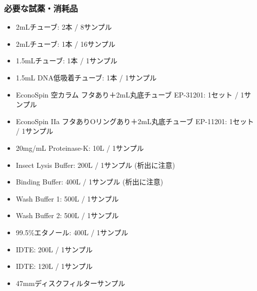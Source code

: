\documentclass[titlepage,10pt,a4paper]{jsbook}
\begin{document}
\subsubsection{必要な試薬・消耗品}
\begin{itemize}
\item 2mLチューブ: 2本 / 8サンプル
\item 2mLチューブ: 1本 / 16サンプル
\item 1.5mLチューブ: 1本 / 1サンプル
\item 1.5mL DNA低吸着チューブ: 1本 / 1サンプル
\item EconoSpin 空カラム フタあり＋2mL丸底チューブ EP-31201: 1セット / 1サンプル
\item EconoSpin IIa フタありOリングあり＋2mL丸底チューブ EP-11201: 1セット / 1サンプル
\item 20mg/mL Proteinase-K: 10{\textmu}L / 1サンプル
\item Insect Lysis Buffer: 200{\textmu}L / 1サンプル (析出に注意)
\item Binding Buffer: 400{\textmu}L / 1サンプル (析出に注意)
\item Wash Buffer 1: 500{\textmu}L / 1サンプル
\item Wash Buffer 2: 500{\textmu}L / 1サンプル
\item 99.5\%エタノール: 400{\textmu}L / 1サンプル
\item IDTE: 200{\textmu}L / 1サンプル
\item IDTE: 120{\textmu}L / 1サンプル
\item 47mmディスクフィルターサンプル
\end{itemize}
\end{document}
